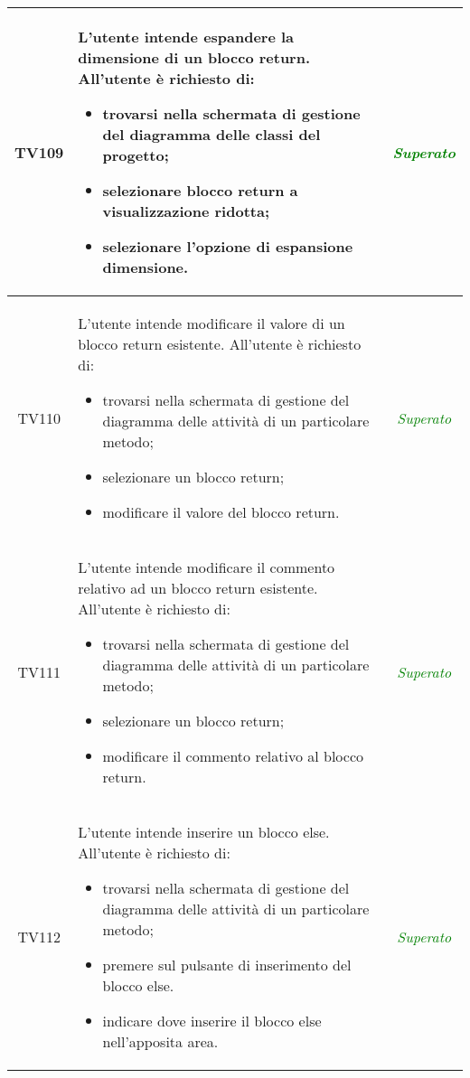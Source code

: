 \begin{longtable}{|c|>{}m{8cm}|c|}
\hypertarget{TV4.29}{TV109} & L'utente intende espandere la dimensione di un blocco return.
All'utente è richiesto di:
\begin{itemize}
	\item trovarsi nella schermata di gestione del diagramma delle classi del progetto;
	\item selezionare blocco return a visualizzazione ridotta;
	\item selezionare l'opzione di espansione dimensione.
\end{itemize} & \textcolor{Green}{\textit{Superato}}\\ \hline

\hypertarget{TV4.30.1}{TV110} & L'utente intende modificare il valore di un blocco return esistente.
All'utente è richiesto di:
\begin{itemize}
	\item trovarsi nella schermata di gestione del diagramma delle attività di un particolare metodo;
	\item selezionare un blocco return;
	\item modificare il valore del blocco return.
\end{itemize} & \textcolor{Green}{\textit{Superato}}\\ \hline

\hypertarget{TV4.30.2}{TV111} & L'utente intende modificare il commento relativo ad un blocco return esistente.
All'utente è richiesto di:
\begin{itemize}
	\item trovarsi nella schermata di gestione del diagramma delle attività di un particolare metodo;
	\item selezionare un blocco return;
	\item modificare il commento relativo al blocco return.
\end{itemize} & \textcolor{Green}{\textit{Superato}}\\ \hline

\hypertarget{TV4.31}{TV112} & L'utente intende inserire un blocco else.
All'utente è richiesto di:
\begin{itemize}
	\item trovarsi nella schermata di gestione del diagramma delle attività di un particolare metodo;
	\item premere sul pulsante di inserimento del blocco else.
	\item indicare dove inserire il blocco else nell'apposita area.
\end{itemize} & \textcolor{Green}{\textit{Superato}}\\ \hline


\end{longtable}
